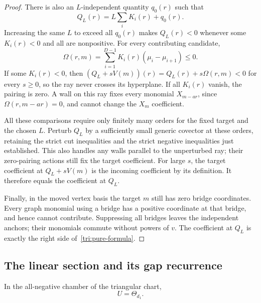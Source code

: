 \begin{proof}
There is also an $L$-independent quantity $q_0(r)$ such that
\[
 Q_L(r)=L\sum_iK_i(r)+q_0(r).
\]
Increasing the same $L$ to exceed all $q_0(r)$ makes $Q_L(r)<0$
whenever some $K_i(r)<0$ and all are nonpositive.  For every
contributing candidate,
\begin{equation}\label{tri:no-crossing-pairing}
 \Omega(r,m)=\sum_{i=1}^{D-1}K_i(r)(\mu_i-\mu_{i+1})\leq0.
\end{equation}
If some $K_i(r)<0$, then
$(Q_L+sV(m))(r)=Q_L(r)+s\Omega(r,m)<0$ for every $s\geq0$,
so the ray never crosses its hyperplane.  If all $K_i(r)$ vanish,
the pairing is zero.  A wall on this ray fixes every monomial
$X_{m-ar}$, since $\Omega(r,m-ar)=0$, and cannot change the
$X_m$ coefficient.

All these comparisons require only finitely many orders for the
fixed target and the chosen $L$.  Perturb $Q_L$ by a sufficiently
small generic covector at these orders, retaining the strict cut
inequalities and the strict negative inequalities just established.
This also handles any walls parallel to the unperturbed ray; their
zero-pairing actions still fix the target coefficient.  For large
$s$, the target coefficient at $Q_L+sV(m)$ is the incoming
coefficient by its definition.  It therefore equals the coefficient
at $Q_L$.

Finally, in the moved vertex basis the target $m$ still has zero
bridge coordinates.  Every graph monomial using a bridge has a
positive coordinate at that bridge, and hence cannot contribute.
Suppressing all bridges leaves the independent anchors; their
monomials commute without powers of $v$.  The coefficient at $Q_L$
is exactly the right side of~\eqref{tri:pure-formula}.
\end{proof}

\subsection{The linear section and its gap recurrence}

\begin{lemma}\label{tri:linear}
In the all-negative chamber of the triangular chart,
\[
 U=\Theta_{d_1}.
\]
\end{lemma}

